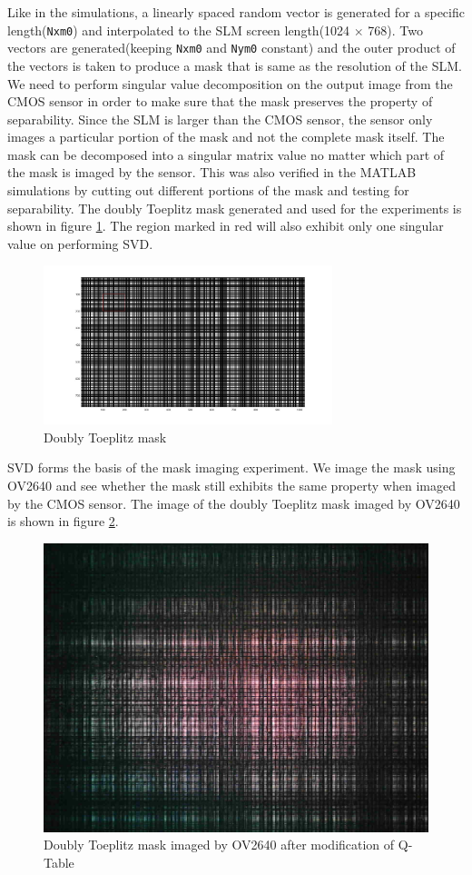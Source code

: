 Like in the simulations, a linearly spaced random vector is generated for a specific length(\texttt{Nxm0}) and interpolated to the SLM screen length(1024 $\times$ 768). Two vectors are generated(keeping \texttt{Nxm0} and \texttt{Nym0} constant) and the outer product of the vectors is taken to produce a mask that is same as the resolution of the SLM.
We need to perform singular value decomposition on the output image from the CMOS sensor in order to make sure that the mask preserves the property of separability. Since the SLM is larger than the CMOS sensor, the sensor only images a particular portion of the mask and not the complete mask itself. The mask can be decomposed into a singular matrix value no matter which part of the mask is imaged by the sensor. This was also verified in the MATLAB simulations by cutting out different portions of the mask and testing for separability. The doubly Toeplitz mask generated and used for the experiments is shown in figure \ref{fig:doubly_toepl_custom}. The region marked in red will also exhibit only one singular value on performing SVD.
\begin{figure}[h]
\centering
\includegraphics[width = 0.75\textwidth]{pics/slm/mask_sub_prop}
\caption{Doubly Toeplitz mask}
\label{fig:doubly_toepl_custom}
\end{figure}
SVD forms the basis of the mask imaging experiment. We image the mask using OV2640 and see whether the mask still exhibits the same property when imaged by the CMOS sensor. The image of the doubly Toeplitz mask imaged by OV2640 is shown in figure \ref{fig:dt_ov2640}.
\begin{figure}[h]
\centering
\includegraphics[scale=0.20]{pics/slm/ov2640dtmask.jpg}
\caption{Doubly Toeplitz mask imaged by OV2640 after modification of Q-Table}
\label{fig:dt_ov2640}
\end{figure}
